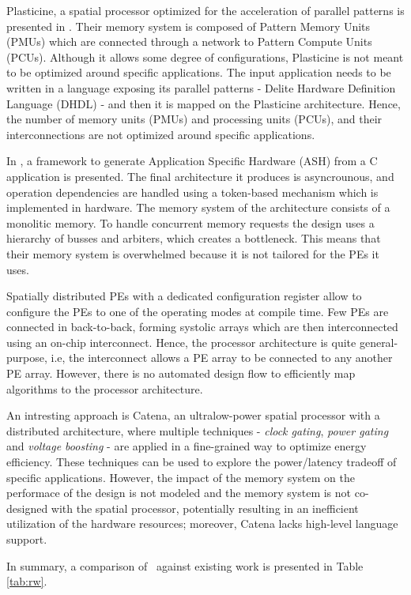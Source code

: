 Plasticine, a spatial processor optimized for the acceleration of parallel patterns is presented in \cite{prabhakar2017plasticine}. Their memory system is composed of Pattern Memory Units (PMUs) which are connected through a network to Pattern Compute Units (PCUs). Although it allows some degree of configurations, Plasticine is not meant to be optimized around specific applications. The input application needs to be written in a language exposing its parallel patterns - Delite Hardware Definition Language (DHDL) - and then it is mapped on the Plasticine architecture. Hence, the number of memory units (PMUs) and processing units (PCUs), and their interconnections are not optimized around specific applications.

In \cite{budiu2004spatial}, a framework to generate Application Specific Hardware (ASH) from a C application is presented. The final architecture it produces is asyncrounous, and operation dependencies are handled using a token-based mechanism which is implemented in hardware. The memory system of the architecture consists of a monolitic memory. To handle concurrent memory requests the design uses a hierarchy of busses and arbiters, which creates a bottleneck. This means that their memory system is overwhelmed because it is not tailored for the PEs it uses.

Spatially distributed PEs with a dedicated configuration register allow to configure the PEs to one of the operating modes \cite{streamproc2019} at compile time. Few PEs are connected in back-to-back, forming systolic arrays which are then interconnected using an on-chip interconnect. Hence, the processor architecture is quite general-purpose, i.e, the interconnect allows a PE array to be connected to any another PE array. However, there is no automated design flow to efficiently map algorithms to the processor architecture.

An intresting approach is Catena\cite{cerqueira2020catena}, an ultralow-power spatial processor with a distributed architecture, where multiple techniques - \textit{clock gating}, \textit{power gating} and \textit{voltage boosting} - are applied in a fine-grained way to optimize energy efficiency. These techniques can be used to explore the power/latency tradeoff of specific applications. However, the impact of the memory system on the performace of the design is not modeled and the memory system is not co-designed with the spatial processor, potentially resulting in an inefficient utilization of the hardware resources; moreover, Catena lacks high-level language support.

In summary, a comparison of \frameworkname~against existing work is presented in Table \ref{tab:rw}.
